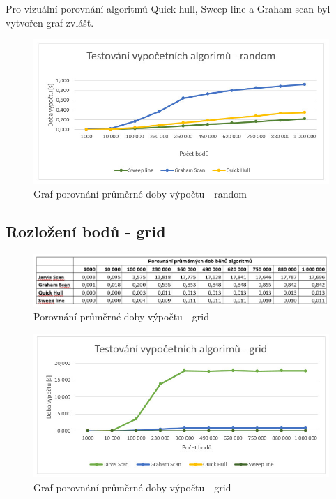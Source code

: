 \documentclass[a4paper, 12pt]{article}
\begin{document}
Pro vizuální porovnání algoritmů Quick hull, Sweep line a Graham scan byl vytvořen graf zvlášť.
\begin{figure}[h!]
	\centering
	\includegraphics[width=12cm]{g2_random.jpg}
	\caption{Graf porovnání průměrné doby výpočtu - random}
\end{figure}

\subsection {Rozložení bodů - grid}
\begin{figure}[h!]
	\centering
	\includegraphics[width=15cm]{grid.jpg}
	\caption{Porovnání průměrné doby výpočtu - grid}
\end{figure}


\begin{figure}[h!]
	\centering
	\includegraphics[width=12cm]{g1_grid.jpg}
	\caption{Graf porovnání průměrné doby výpočtu - grid}
\end{figure}
\clearpage
\end{document}

